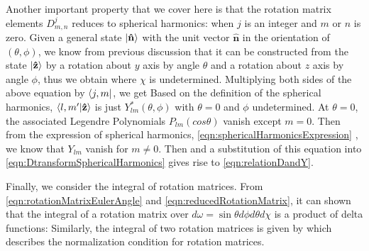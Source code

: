 Another important property that we cover here is that the 
rotation matrix elements  $D^{j}_{m, n}$ reduces to spherical harmonics: 
when $j$ is an integer and $m$ or $n$ is zero. Given a general state $|  \mathbf{\hat{n} }  \rangle$ with the unit vector 
$\mathbf{\hat{n}}$ in the orientation of $(\theta, \phi)$, we know from previous discussion that  it can be constructed 
from the state $| \mathbf{\hat{z}} \rangle$ by a rotation about $y$ axis by angle $\theta$ and a rotation about $z$ axis by
angle $\phi$, thus we obtain
where $\chi$ is undetermined. Multiplying both sides of the above equation by $\langle j, m |$, we get 
Based on the definition of the spherical harmonics, $\langle l, m^{\prime}  | \mathbf{\hat{z}} \rangle$ is just 
$Y_{lm}^{*}(\theta, \phi)$ with $\theta = 0$ and $\phi$ undetermined. At $\theta = 0$, the associated Legendre
 Polynomials $P_{lm}(cos\theta)$ vanish except $m=0$. Then from the expression of spherical harmonics,
 \autoref{eqn:sphericalHarmonicsExpression} , we know that $Y_{lm}$ vanish for $m\neq 0$. Then 
and a substitution of this equation into \autoref{eqn:DtransformSphericalHarmonics} gives rise to \autoref{eqn:relationDandY}. 

Finally, we consider the integral of rotation matrices. From \autoref{eqn:rotationMatrixEulerAngle} and 
\autoref{eqn:reducedRotationMatrix}, it can shown that the integral of a rotation matrix over $d\omega = \sin\theta d\phi d\theta d\chi$ is a
product of delta functions:
Similarly, the integral of two rotation matrices is given by
which describes the normalization condition for rotation matrices. 

